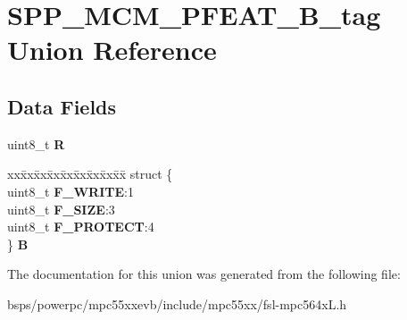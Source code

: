 \hypertarget{unionSPP__MCM__PFEAT__8B__tag}{}\section{S\+P\+P\+\_\+\+M\+C\+M\+\_\+\+P\+F\+E\+A\+T\+\_\+B\+\_\+tag Union Reference}
\label{unionSPP__MCM__PFEAT__8B__tag}
\subsection*{Data Fields}
\begin{DoxyCompactItemize}
\item 
\mbox{\label{unionSPP__MCM__PFEAT__8B__tag_ad909388335423a57a123f29739854e2c}} 
uint8\+\_\+t {\bfseries R}
\item 
\mbox{\label{unionSPP__MCM__PFEAT__8B__tag_a1498f68933af36ee5e484cfa4bb993af}} 
\begin{tabbing}
xx\=xx\=xx\=xx\=xx\=xx\=xx\=xx\=xx\=\kill
struct \{\\
\>uint8\_t {\bfseries F\_WRITE}:1\\
\>uint8\_t {\bfseries F\_SIZE}:3\\
\>uint8\_t {\bfseries F\_PROTECT}:4\\
\} {\bfseries B}\\

\end{tabbing}\end{DoxyCompactItemize}


The documentation for this union was generated from the following file\+:\begin{DoxyCompactItemize}
\item 
bsps/powerpc/mpc55xxevb/include/mpc55xx/fsl-\/mpc564x\+L.\+h\end{DoxyCompactItemize}
